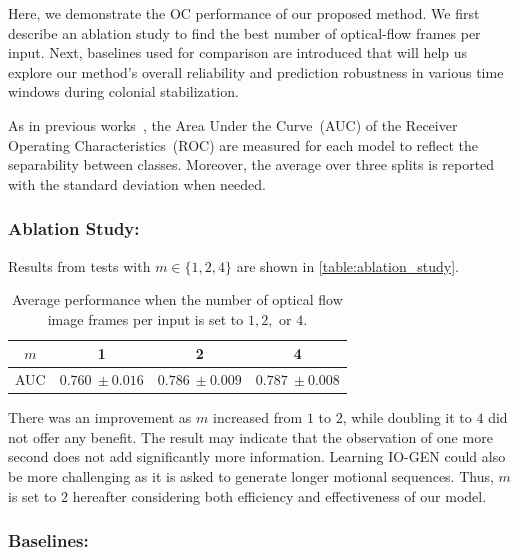 \documentclass[letterpaper]{article} %
\let\orgautoref\autoref
\renewcommand{\autoref}
{\def\equationautorefname{Equation}%
	\def\figureautorefname{Fig.}%
	\def\subfigureautorefname{Fig.}%
	\def\Itemautorefname{item}%
	\def\tableautorefname{Table}%
	\def\exerciseautorefname{Exercise}%
	\def\starexerciseautorefname{Exercise}%
	\def\sectionautorefname{Section}%
	\def\subsectionautorefname{Section}%
	\def\subsubsectionautorefname{Section}%
	\def\chapterautorefname{Section}%
	\def\partautorefname{Part}%
	\orgautoref}
\begin{document}
Here, we demonstrate the OC performance of our proposed method. We first
describe an ablation study to find the best number of optical-flow
frames per input. Next, baselines used for comparison are introduced
that will help us explore our method's overall reliability and
prediction robustness in various time windows during colonial
stabilization.

As in previous works~\citep{RVGDSBMK18}, the Area Under the Curve~(AUC)
of the Receiver Operating Characteristics~(ROC) are measured for
each model to reflect the separability between classes. Moreover,
the average over three splits is reported with the standard
deviation when needed.

\subsubsection{Ablation Study:}
\label{sec:ablation_study}
Results from tests with $m \in \{1, 2, 4\}$ are shown in
\autoref{table:ablation_study}.
\setlength{\tabcolsep}{0.5em} %
{\renewcommand{\arraystretch}{1.2}%
	\begin{table}
		\centering
		\begin{tabular}{|c|c|c|c|}
			\hline
			$m$  &  1 & 2 & 4  \\ \hline\hline
			AUC & $0.760~\pm 0.016$ & $0.786~\pm 0.009$ & $0.787~\pm 0.008$
			\\ \hline
		\end{tabular}
		\caption{Average performance when the number of optical flow
		image frames per input is set to $1, 2,$ or $4$.}
		\label{table:ablation_study}
	\end{table}
}%
There was an improvement as $m$ increased from $1$ to $2$,
while doubling it to $4$ did not offer any benefit. The result may
indicate that the observation of one more second does not add
significantly more information. Learning \mbox{IO-GEN} could also be more
challenging as it is asked to generate longer motional sequences.  Thus,
$m$ is set to $2$ hereafter considering both efficiency and
effectiveness of our model.


\subsubsection{Baselines:}
\label{sec:baselines}
\end{document}
